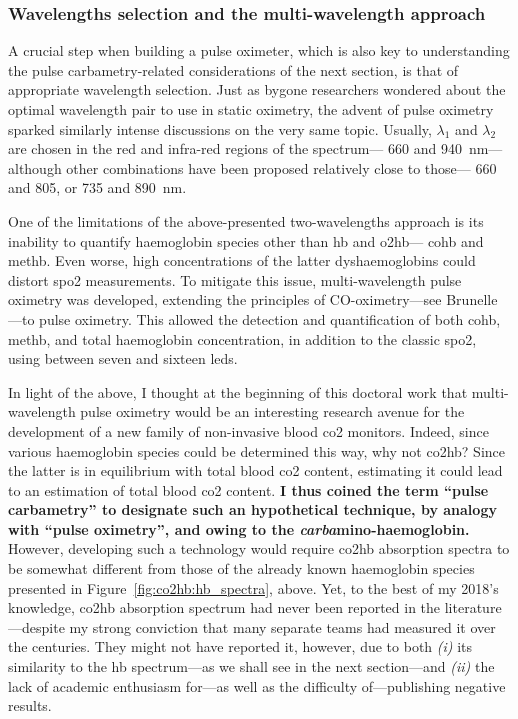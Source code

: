 \subsubsection{Wavelengths selection and the multi-wavelength approach}\label{sect:co2hb:spo2_multiwl}

A crucial step when building a pulse oximeter, which is also key to understanding the pulse carbametry-related considerations of the next section, is that of appropriate wavelength selection. Just as bygone researchers wondered about the optimal wavelength pair to use in static oximetry\cite{nilsson1960, mook1969}, the advent of pulse oximetry sparked similarly intense discussions on the very same topic\cite[Chap.~4]{damianou1995, mannheimer1997, vazquezjaccaud2011}. Usually, $\lambda_1$ and $\lambda_2$ are chosen in the red and infra-red regions of the spectrum---\eg{} 660 and 940~nm---although other combinations have been proposed relatively close to those---\eg{} 660 and 805, or 735 and 890~nm\cite{mannheimer1997, li2014}.

One of the limitations of the above-presented two-wavelengths approach is its inability to quantify haemoglobin species other than \gls{hb} and \gls{o2hb}---\eg{} \gls{cohb} and \gls{methb}. Even worse, high concentrations of the latter dyshaemoglobins could distort \gls{spo2} measurements\cite{wukitsch1987, ralston1991}. To mitigate this issue, multi-wavelength pulse oximetry was developed, extending the principles of CO-oximetry---see Brunelle \etal{}\cite{brunelle1996}---to pulse oximetry. This allowed the detection and quantification of both \gls{cohb}, \gls{methb}, and total haemoglobin concentration, in addition to the classic \gls{spo2}, using between seven and sixteen \glspl{led}\cite{manzke1996, suzaki2006, katja2011}.

In light of the above, I thought at the beginning of this doctoral work that multi-wavelength pulse oximetry would be an interesting research avenue for the development of a new family of non-invasive blood \gls{co2} monitors. Indeed, since various haemoglobin species could be determined this way, why not \gls{co2hb}? Since the latter is in equilibrium with total blood \gls{co2} content, estimating it could lead to an estimation of total blood \gls{co2} content. \textbf{I thus coined the term \enquote{pulse carbametry} to designate such an hypothetical technique, by analogy with \enquote{pulse oximetry}, and owing to the \emph{carba}mino-haemoglobin.} However, developing such a technology would require \gls{co2hb} absorption spectra to be somewhat different from those of the already known haemoglobin species presented in Figure~\ref{fig:co2hb:hb_spectra}, above. Yet, to the best of my 2018's knowledge, \gls{co2hb} absorption spectrum had never been reported in the literature---despite my strong conviction that many separate teams had measured it over the centuries. They might not have reported it, however, due to both \textit{(i)} its similarity to the \gls{hb} spectrum---as we shall see in the next section---and \textit{(ii)} the lack of academic enthusiasm for---as well as the difficulty of---publishing negative results.

